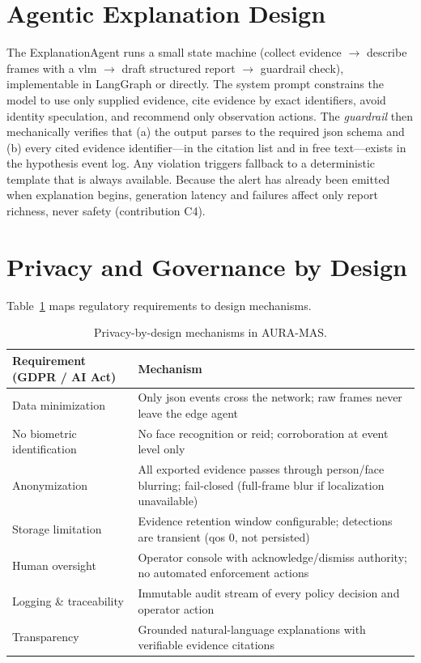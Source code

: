 \section{Agentic Explanation Design}

The ExplanationAgent runs a small state machine (collect evidence $\rightarrow$ describe frames with a \gls{vlm} $\rightarrow$ draft structured report $\rightarrow$ guardrail check), implementable in LangGraph \cite{langgraph2024} or directly. The system prompt constrains the model to use only supplied evidence, cite evidence by exact identifiers, avoid identity speculation, and recommend only observation actions. The \emph{guardrail} then mechanically verifies that (a) the output parses to the required \gls{json} schema and (b) every cited evidence identifier---in the citation list and in free text---exists in the hypothesis event log. Any violation triggers fallback to a deterministic template that is always available. Because the alert has already been emitted when explanation begins, generation latency and failures affect only report richness, never safety (contribution C4).

\section{Privacy and Governance by Design}

Table~\ref{tab:privacy} maps regulatory requirements to design mechanisms.

\begin{table}[H]
\centering
\caption{Privacy-by-design mechanisms in AURA-MAS.}
\label{tab:privacy}
\small
\begin{tabular}{p{4.5cm}p{8.5cm}}
\toprule
\textbf{Requirement (GDPR / AI Act)} & \textbf{Mechanism} \\
\midrule
Data minimization & Only \gls{json} events cross the network; raw frames never leave the edge agent \\
No biometric identification & No face recognition or \gls{reid}; corroboration at event level only \\
Anonymization & All exported evidence passes through person/face blurring; fail-closed (full-frame blur if localization unavailable) \\
Storage limitation & Evidence retention window configurable; detections are transient (\gls{qos} 0, not persisted) \\
Human oversight & Operator console with acknowledge/dismiss authority; no automated enforcement actions \\
Logging \& traceability & Immutable audit stream of every policy decision and operator action \\
Transparency & Grounded natural-language explanations with verifiable evidence citations \\
\bottomrule
\end{tabular}
\end{table}


